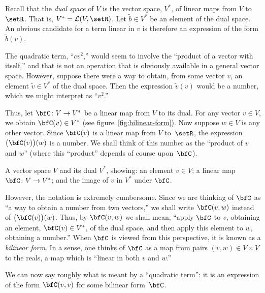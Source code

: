 \documentclass[10pt, a4paper]{article}
\begin{document}
Recall that the \emph{dual space} of $V$ is the vector space, $V^*$, of
linear maps from $V$ to~$\setR$. That is, $V^*=\mathcal{L}(V, \setR)$. Let
$\tilde{b}\in V^*$ be an element of the dual space. An obvious candidate
for a term linear in $v$ is therefore an expression of the form
$\tilde{b}(v)$.

The quadratic term, ``$cv^2$,'' would seem to involve the ``product of
a vector with itself,'' and that is not an operation that is obviously
available in a general vector space. However, suppose there were a way
to obtain, from some vector $v$, an element $\tilde{v}\in V^*$ of the
dual space. Then the expression $\tilde{v}(v)$ would be a number, which
we might interpret as ``$v^2$.''

Thus, let $\bfC\colon V\to V^*$ be a linear map from $V$ to its
dual. For any vector $v\in V$, we obtain $\bfC(v)\in V^*$ (see
figure~\ref{fig:bilinear-form}). Now suppose $w\in V$ is any other
vector. Since $\bfC(v)$ is a linear map from $V$ to~$\setR$,
the expression $\bigl(\bfC(v)\bigr)(w)$ is a number. We shall think of
this number as the ``product of $v$ and $w$'' (where this “product”
depends of course upon~$\bfC$).
\begin{marginfigure}
  \begin{center}
  \end{center}
  \caption{A vector space $V$ and its dual $V^*$, showing: an element
    $v\in V$; a linear map $\bfC\colon V\to V^*$; and the image of $v$ in
    $V^*$ under $\bfC$.\label{fig:bilinear-form}}
\end{marginfigure}

However, the notation is extremely cumbersome. Since we are thinking
of $\bfC$ as ``a way to obtain a number from two vectors,'' we shall
write $\bfC(v,w)$ instead of $\bigl(\bfC(v)\bigr)(w)$. Thus, by
$\bfC(v, w)$ we shall mean, ``apply $\bfC$ to $v$, obtaining an
element, $\bfC(v)\in V^*$, of the dual space, and then apply this
element to $w$, obtaining a number.'' When $\bfC$ is viewed from this
perspective, it is known as a \emph{bilinear form}. In a sense, one
thinks of $\bfC$ as a map from pairs $(v,w)\in V\times V$ to the reals, a map
which is “linear in both $v$ and $w$.”

We can now say roughly what is meant by a “quadratic term”: it is an
expression of the form $\bfC(v,v)$ for some bilinear form~$\bfC$.
\end{document}
